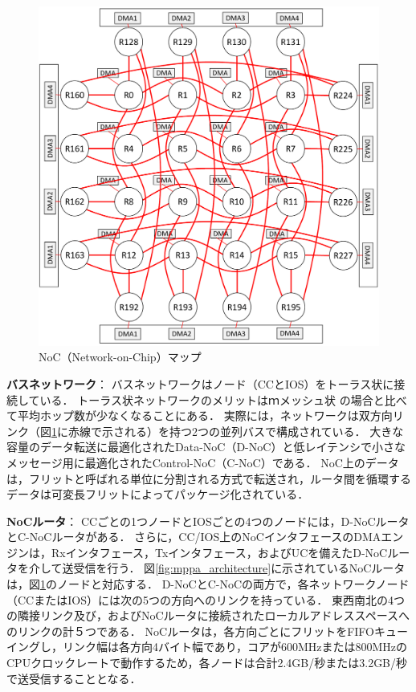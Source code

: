 \documentclass[submit,techrep]{ipsj_v2/UTF8/ipsj}
\begin{document}
\begin{figure}[t]
  \centering
  \includegraphics[width=0.65\linewidth]{../figure/noc_map.pdf}
  \caption{\label{fig:noc_map}
    NoC（Network-on-Chip）マップ}
\end{figure}

\textbf{バスネットワーク}：
バスネットワークはノード（CCとIOS）をトーラス状に接続している\cite{dally2001route}．
トーラス状ネットワークのメリットはｍメッシュ状\cite{vangal200780} \cite{taylor2002raw}の場合と比べて平均ホップ数が少なくなることにある．
実際には，ネットワークは双方向リンク（図\ref{fig:noc_map}に赤線で示される）を持つ2つの並列バスで構成されている．
大きな容量のデータ転送に最適化されたData-NoC（D-NoC）と低レイテンシで小さなメッセージ用に最適化されたControl-NoC（C-NoC）である．
NoC上のデータは，フリットと呼ばれる単位に分割される方式で転送され，ルータ間を循環するデータは可変長フリットによってパッケージ化されている．

\textbf{NoCルータ}：
CCごとの1つノードとIOSごとの4つのノードには，D-NoCルータとC-NoCルータがある．
さらに，CC/IOS上のNoCインタフェースのDMAエンジンは，Rxインタフェース，Txインタフェース，およびUCを備えたD-NoCルータを介して送受信を行う．
図\ref{fig:mppa_architecture}に示されているNoCルータは，図\ref{fig:noc_map}のノードと対応する．
D-NoCとC-NoCの両方で，各ネットワークノード（CCまたはIOS）には次の5つの方向へのリンクを持っている．
東西南北の4つの隣接リンク及び，およびNoCルータに接続されたローカルアドレススペースへのリンクの計５つである．
NoCルータは，各方向ごとにフリットをFIFOキューイングし，リンク幅は各方向4バイト幅であり，コアが600MHzまたは800MHzのCPUクロックレートで動作するため，各ノードは合計2.4GB/秒または3.2GB/秒で送受信することとなる．
\end{document}
